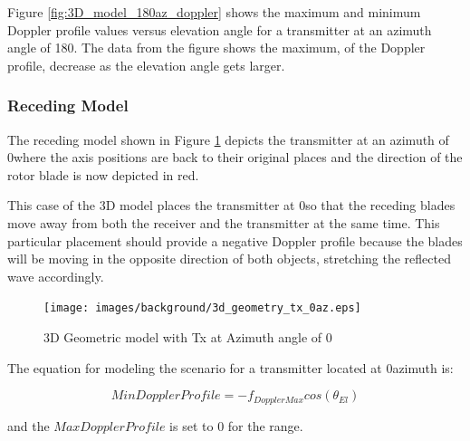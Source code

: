 Figure \ref{fig:3D_model_180az_doppler} shows the maximum and minimum Doppler profile values versus elevation angle for a transmitter at an azimuth angle of 180\textdegree. The data from the figure shows the maximum, of the Doppler profile, decrease as the elevation angle gets larger.

\subsubsection{Receding Model}
The receding model shown in Figure \ref{fig:3D_model_0az} depicts the transmitter at an azimuth of 0\textdegree \space where the axis positions are back to their original places and the direction of the rotor blade is now depicted in red.

This case of the 3D model places the transmitter at 0\textdegree \space so that the receding blades move away from both the receiver and the transmitter at the same time. This particular placement should provide a negative Doppler profile because the blades will be moving in the opposite direction of both objects, stretching the reflected wave accordingly.

\begin{figure}
	\begin{center}
		\texttt{[image: images/background/3d\_geometry\_tx\_0az.eps]}
		\caption{3D Geometric model with Tx at Azimuth angle of 0\textdegree}
		\label{fig:3D_model_0az}
	\end{center}
\end{figure}

The equation for modeling the scenario for a transmitter located at 0\textdegree \space azimuth is:

\begin{equation}
	MinDopplerProfile = -f_{DopplerMax}cos(\theta_{El})
	\label{eq:theory_0_lower}
\end{equation}

and the $MaxDopplerProfile$ is set to 0 for the range.


